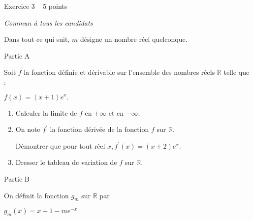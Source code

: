 
%
\begin{h2}Exercice 3   5 points\end{h2}
\textit{Commun à tous les candidats}
\par
Dans tout ce qui suit, $m$ désigne un nombre réel quelconque.
\begin{h3}Partie A\end{h3}
Soit $f$ la fonction définie et dérivable sur l'ensemble des nombres réels $\mathbb{R}$ telle que :

\begin{center}
$ f\left(x\right)=\left(x+1\right)e^{x}.$
\end{center}

\begin{enumerate}
     \item
     Calculer la limite de $f$ en $+ \infty $ et en $-\infty $.
     \item
     On note $f^{\prime}$ la fonction dérivée de la fonction $f$ sur $\mathbb{R}$.
     \par
     Démontrer que pour tout réel $x, f^{\prime}\left(x\right)=\left(x+2\right)e^{x}$.
     \item
     Dresser le tableau de variation de $f$ sur $\mathbb{R}$.
\end{enumerate}
\begin{h3}Partie B\end{h3}
On définit la fonction $g_{m}$ sur $\mathbb{R}$ par

\begin{center}
$g_{m}\left(x\right)=x+1-me^{-x}$
\end{center}

